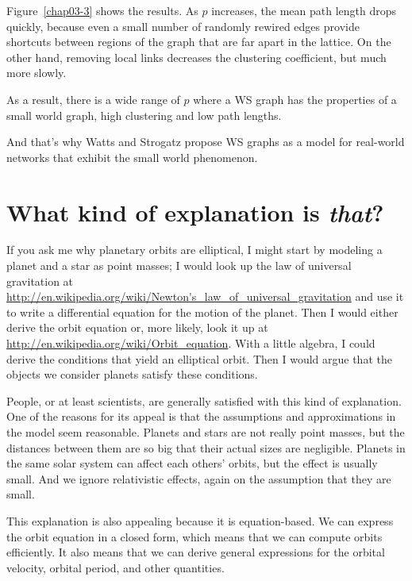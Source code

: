 \documentclass[12pt]{book}
\theoremstyle{exercise}
\begin{document}
Figure~\ref{chap03-3} shows the results.  As $p$ increases, the mean
path length drops quickly, because even a small number of randomly
rewired edges provide shortcuts between regions of the graph that
are far apart in the lattice.  On the other hand, removing local links
decreases the clustering coefficient, but much more slowly.

As a result, there is a wide range of $p$ where a WS graph has the
properties of a small world graph, high clustering and low path
lengths.

And that's why Watts and Strogatz propose WS graphs as a
model for real-world networks that exhibit the small world phenomenon.


\section{What kind of explanation is {\em that}?}

If you ask me why planetary orbits are elliptical,
I might start by modeling a planet and a star as point masses; I
would look up the law of universal gravitation at
\url{http://en.wikipedia.org/wiki/Newton's_law_of_universal_gravitation}
and use it to write a differential equation for the motion of
the planet.  Then I would either derive the orbit equation or,
more likely, look it up at \url{http://en.wikipedia.org/wiki/Orbit_equation}.
With a little algebra, I could derive the conditions that
yield an elliptical orbit.  Then I would argue that the objects
we consider planets satisfy these conditions.

People, or at least scientists, are generally satisfied with
this kind of explanation.  One of the reasons for its appeal
is that the assumptions and approximations in the model seem
reasonable.  Planets and stars are not really point masses,
but the distances between them are so big that their actual
sizes are negligible.  Planets in the same solar system can
affect each others' orbits, but the effect is usually small.
And we ignore relativistic effects, again on the assumption that
they are small.

This explanation is also appealing because it is equation-based.
We can express the orbit equation in a closed form, which means
that we can compute orbits efficiently.  It also means that
we can derive general expressions for the orbital velocity,
orbital period, and other quantities.
\end{document}

